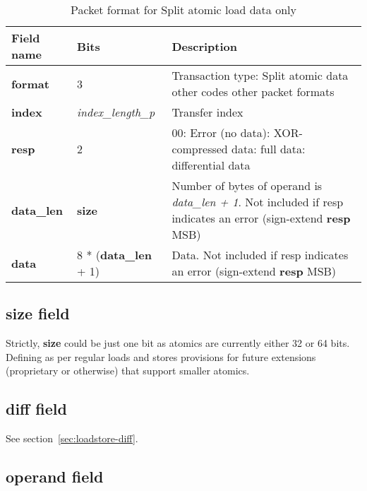\begin{table}[htp]
  \centering
  \caption{Packet format for Split atomic load data only}
  \label{tab:te_datadx0y9}
  \begin{tabulary}{\textwidth}{|l|p{38mm}|p{92mm}|}
    \hline
    {\bf Field name} & {\bf Bits} & {\bf Description} \\
    \hline
    \textbf{format} & 	3	& Transaction type: Split atomic data\newline	
		other codes other packet formats\\
    \hline
    \textbf{index} & \textit{index\_length\_p} & Transfer index\\
    \hline
    \textbf{resp} & 2 & 00: Error (no data):  XOR-compressed data: full data: differential data\\
    \hline
    \textbf{data\_len} & \textbf{size} &	Number of bytes of operand is \textit{data\_len + 1}. Not included if resp indicates an error (sign-extend \textbf{resp} MSB)\\
    \hline
    \textbf{data} &  8 * (\textbf{data\_len} + 1) & Data. Not included if resp indicates an error (sign-extend \textbf{resp} MSB)\\
    \hline
  \end{tabulary}
\end{table}

\subsection{size field} \label{sec:atomic-size}

Strictly, \textbf{size} could be just one bit as atomics are currently either 32 or 64 bits.  
Defining as per regular loads and stores provisions for future extensions (proprietary or otherwise) that support smaller atomics.

\subsection{diff field} \label{sec:atomic-diff}

See section~\ref{sec:loadstore-diff}.

\subsection{operand field} \label{sec:atomic-operand}

